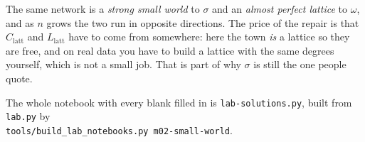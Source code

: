 \documentclass[a4paper, 11pt]{extarticle}
\begin{document}
The same network is a \emph{strong small world} to $\sigma$ and an
\emph{almost perfect lattice} to $\omega$, and as $n$ grows the two run in
opposite directions. The price of the repair is that $C_{\text{latt}}$ and
$L_{\text{latt}}$ have to come from somewhere: here the town \emph{is} a
lattice so they are free, and on real data you have to build a lattice with
the same degrees yourself, which is not a small job. That is part of why
$\sigma$ is still the one people quote.

\vspace{0.4em}

{\small The whole notebook with every blank filled in is
\texttt{lab-solutions.py}, built from \texttt{lab.py} by\\
\texttt{tools/build\_lab\_notebooks.py m02-small-world}.}
\end{document}
